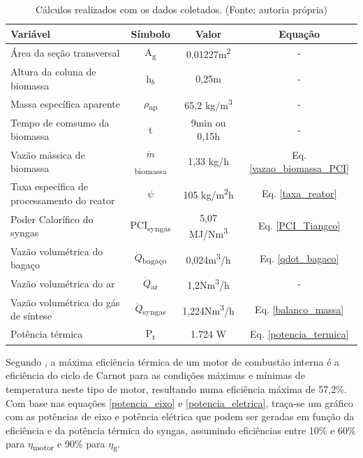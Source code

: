 \begin{table}[h]
	\centering
	\caption{Cálculos realizados com os dados coletados. (Fonte: autoria própria)}
	\begin{tabular}{|l|c|c|c|}
		\hline
		Variável & Símbolo & Valor & Equação \\
		\hline
		
		Área da seção transversal & A\textsubscript{g} & 0,01227m\textsuperscript{2} & - \\
		
		Altura da coluna de biomassa & h$_b$ & 0,25m & -\\
		
		Massa específica aparente & $\rho$\textsubscript{ap} & 65,2 kg/m\textsuperscript{3} & - \\
		
		Tempo de comsumo da biomassa & t & 9min ou 0,15h & -\\
		
		Vazão mássica de biomassa & $\dot{m}$\textsubscript{biomassa} & 1,33 kg/h & Eq. \ref{vazao_biomassa_PCI}\\
		
		Taxa específica de processamento do reator & $\psi$ & 105 kg/m\textsuperscript{2}h & Eq. \ref{taxa_reator}\\
		
		\rowcolor{lightgray} Poder Calorífico do syngas & PCI\textsubscript{syngas} & 5,07 MJ/Nm\textsuperscript{3} & Eq. \ref{PCI_Tiangco}\\
		
		Vazão volumétrica do bagaço & $\dot{Q}$\textsubscript{bagaço} & 0,024m\textsuperscript{3}/h & Eq. \ref{qdot_bagaco}\\
		
		Vazão volumétrica do ar & $\dot{Q}$\textsubscript{ar} & 1,2Nm\textsuperscript{3}/h & -\\
		
		Vazão volumétrica do gás de síntese & $\dot{Q}$\textsubscript{syngas} & 1,224Nm\textsuperscript{3}/h & Eq. \ref{balanco_massa}\\
		
		\rowcolor{lightgray} Potência térmica & P\textsubscript{t} & 1.724 W & Eq. \ref{potencia_termica}\\
		
		\hline
\end{tabular}
\label{tabela_resultados_2}
\end{table}	

Segundo \cite{brunetti2012}, a máxima eficiência térmica de um motor de combustão interna é a eficiência do ciclo de Carnot para as condições máximas e mínimas de temperatura neste tipo de motor, resultando numa eficiência máxima de 57,2\%.
Com base nas equações \ref{potencia_eixo} e \ref{potencia_eletrica}, traça-se um gráfico com as potências de eixo e potência elétrica que podem ser geradas em função da eficiência e da potência térmica do syngas, assumindo eficiências entre 10\% e 60\% para $\eta$\textsubscript{motor} e 90\% para $\eta$\textsubscript{g}.

